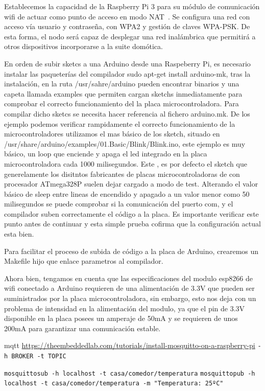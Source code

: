 Establecemos la capacidad de la Raspberry Pi 3 para su módulo de comunicación wifi de actuar como punto de acceso en modo NAT~\cite{raspberrypiasaccesspoint}. Se configura una red con acceso vía usuario y contraseña, con WPA2 y gestión de claves WPA-PSK. De esta forma, el nodo será capaz de desplegar una red inalámbrica que permitirá a otros dispositivos incorporarse a la suite domótica.

En orden de subir sketcs a una Arduino desde una Raspeberry Pi, es necesario instalar las paqueterías del compilador sudo apt-get install arduino-mk, tras la instalación, en la ruta /usr/sahre/arduino pueden encontrar binarios y una capeta llamada examples que permiten cargan sketchs inmediatamente para comprobar el correcto funcionamiento del la placa microcontroladora. Para compilar dicho sketcs se necesita hacer referencia al fichero arduino.mk. De los ejemplo podemos verificar rampidamente el correcto funcionamiento de la microcontroladores utilizamos el mas básico de los \gls{sketch}, situado en /usr/share/arduino/examples/01.Basic/Blink/Blink.ino, este ejemplo es muy básico, un loop que enciende y apaga el led integrado en la placa microcontroladora cada 1000 milisegundos. Este , es por defecto el sketch que generelamente los disitntos fabricantes de placas microcontroladoras de con procesador ATmega328P suelen dejar cargado a modo de test. Alterando el valor básico de sleep entre lineas de encendido y apagado a un valor menor como 50 milisegundos se puede comprobar si la comunicación del puerto com, y el compilador suben correctamente el código a la placa. Es importante verificar este punto antes de continuar y esta simple prueba cofirma que la configuración actual esta bien.

Para facilitar el proceso de subida de código a la placa de Arduino, crearemos un Makefile hijo que enlace parametros al compilador.


Ahora bien, tengamos en cuenta que las especificaciones del modulo esp8266 de wifi conectado a Arduino requieren de una alimentación de 3.3V que pueden ser suministrados por la placa microcontroladora, sin embargo, esto nos deja con un problema de intensidad en la alimentación del modulo, ya que el pin de 3.3V disponible en la placa posees un amperaje de 50mA y se requieren de unos 200mA para garantizar una comunicación estable.


mqtt
\url{https://theembeddedlab.com/tutorials/install-mosquitto-on-a-raspberry-pi}
\verb|-h BROKER -t TOPIC|

\verb|mosquittosub -h localhost -t casa/comedor/temperatura|
\verb|mosquittopub -h localhost -t casa/comedor/temperatura -m "Temperatura: 25ºC"|


